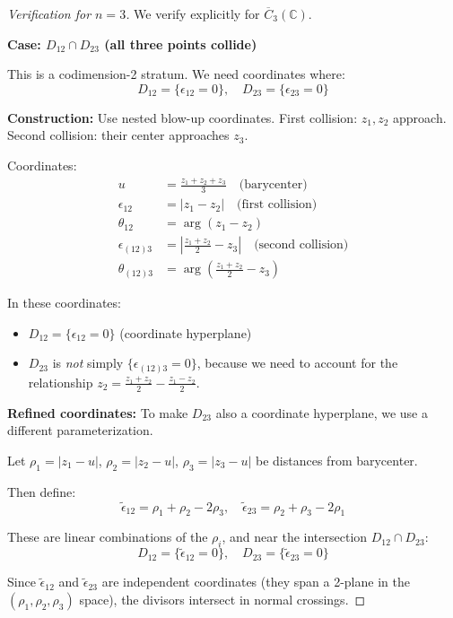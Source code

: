 \begin{proof}[Verification for $n=3$]
We verify explicitly for $\overline{C}_3(\mathbb{C})$.

\textbf{Case: $D_{12} \cap D_{23}$ (all three points collide)}

This is a codimension-2 stratum. We need coordinates where:
$$D_{12} = \{\epsilon_{12} = 0\}, \quad D_{23} = \{\epsilon_{23} = 0\}$$

\textbf{Construction:}
Use nested blow-up coordinates. First collision: $z_1, z_2$ approach. Second collision:
their center approaches $z_3$.

Coordinates:
\begin{align}
u &= \frac{z_1 + z_2 + z_3}{3} \quad \text{(barycenter)}\\
\epsilon_{12} &= |z_1 - z_2| \quad \text{(first collision)}\\
\theta_{12} &= \arg(z_1 - z_2)\\
\epsilon_{(12)3} &= \left| \frac{z_1 + z_2}{2} - z_3 \right| \quad \text{(second collision)}\\
\theta_{(12)3} &= \arg\left(\frac{z_1 + z_2}{2} - z_3\right)
\end{align}

In these coordinates:
\begin{itemize}
\item $D_{12} = \{\epsilon_{12} = 0\}$ (coordinate hyperplane)
\item $D_{23}$ is \emph{not} simply $\{\epsilon_{(12)3} = 0\}$, because we need to account
for the relationship $z_2 = \frac{z_1 + z_2}{2} - \frac{z_1 - z_2}{2}$.
\end{itemize}

\textbf{Refined coordinates:}
To make $D_{23}$ also a coordinate hyperplane, we use a different parameterization.

Let $\rho_1 = |z_1 - u|$, $\rho_2 = |z_2 - u|$, $\rho_3 = |z_3 - u|$ be distances from barycenter.

Then define:
$$\tilde{\epsilon}_{12} = \rho_1 + \rho_2 - 2\rho_3, \quad 
\tilde{\epsilon}_{23} = \rho_2 + \rho_3 - 2\rho_1$$

These are linear combinations of the $\rho_i$, and near the intersection $D_{12} \cap D_{23}$:
$$D_{12} = \{\tilde{\epsilon}_{12} = 0\}, \quad D_{23} = \{\tilde{\epsilon}_{23} = 0\}$$

Since $\tilde{\epsilon}_{12}$ and $\tilde{\epsilon}_{23}$ are independent coordinates
(they span a 2-plane in the $(\rho_1, \rho_2, \rho_3)$ space), the divisors intersect in
normal crossings. \checkmark
\end{proof}

